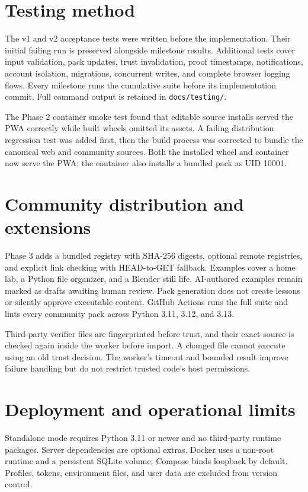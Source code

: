 \documentclass[11pt,a4paper]{article}
\begin{document}
\section{Testing method}
The v1 and v2 acceptance tests were written before the implementation. Their
initial failing run is preserved alongside milestone results. Additional tests
cover input validation, pack updates, trust invalidation, proof timestamps,
notifications, account isolation, migrations, concurrent writes, and complete
browser logging flows. Every milestone runs the cumulative suite before its
implementation commit. Full command output is retained in \texttt{docs/testing/}.

The Phase 2 container smoke test found that editable source installs served the
PWA correctly while built wheels omitted its assets. A failing distribution
regression test was added first, then the build process was corrected to bundle
the canonical web and community sources. Both the installed wheel and container
now serve the PWA; the container also installs a bundled pack as UID 10001.

\section{Community distribution and extensions}
Phase 3 adds a bundled registry with SHA-256 digests, optional remote registries,
and explicit link checking with HEAD-to-GET fallback. Examples cover a home lab,
a Python file organizer, and a Blender still life. AI-authored examples remain
marked as drafts awaiting human review. Pack generation does not create lessons
or silently approve executable content. GitHub Actions runs the full suite and
lints every community pack across Python 3.11, 3.12, and 3.13.

Third-party verifier files are fingerprinted before trust, and their exact source
is checked again inside the worker before import. A changed file cannot execute
using an old trust decision. The worker's timeout and bounded result improve
failure handling but do not restrict trusted code's host permissions.

\section{Deployment and operational limits}
Standalone mode requires Python 3.11 or newer and no third-party runtime packages.
Server dependencies are optional extras. Docker uses a non-root runtime and a
persistent SQLite volume; Compose binds loopback by default. Profiles, tokens,
environment files, and user data are excluded from version control.
\end{document}
